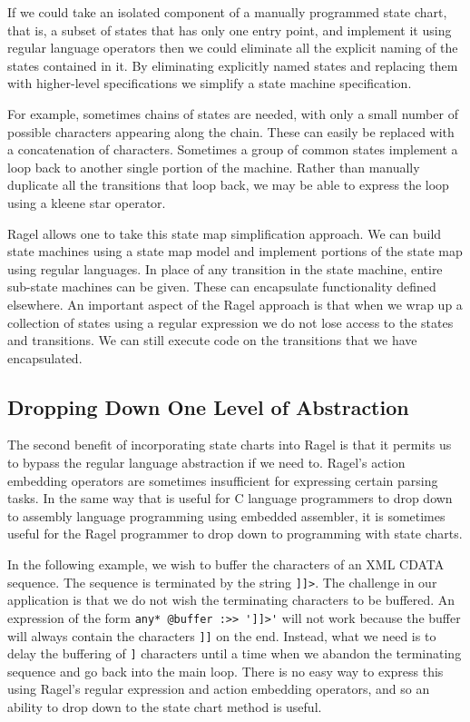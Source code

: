 \documentclass[letterpaper,11pt,oneside]{book}
\begin{document}
If we could take an isolated component of a manually programmed state chart,
that is, a subset of states that has only one entry point, and implement it
using regular language operators then we could eliminate all the explicit
naming of the states contained in it. By eliminating explicitly named states
and replacing them with higher-level specifications we simplify a state machine
specification.

For example, sometimes chains of states are needed, with only a small number of
possible characters appearing along the chain. These can easily be replaced
with a concatenation of characters. Sometimes a group of common states
implement a loop back to another single portion of the machine. Rather than
manually duplicate all the transitions that loop back, we may be able to
express the loop using a kleene star operator.

Ragel allows one to take this state map simplification approach. We can build
state machines using a state map model and implement portions of the state map
using regular languages. In place of any transition in the state machine,
entire sub-state machines can be given. These can encapsulate functionality
defined elsewhere. An important aspect of the Ragel approach is that when we
wrap up a collection of states using a regular expression we do not lose
access to the states and transitions. We can still execute code on the
transitions that we have encapsulated.

\subsection{Dropping Down One Level of Abstraction}
\label{down}

The second benefit of incorporating state charts into Ragel is that it permits
us to bypass the regular language abstraction if we need to. Ragel's action
embedding operators are sometimes insufficient for expressing certain parsing
tasks.  In the same way that is useful for C language programmers to drop down
to assembly language programming using embedded assembler, it is sometimes
useful for the Ragel programmer to drop down to programming with state charts.

In the following example, we wish to buffer the characters of an XML CDATA
sequence. The sequence is terminated by the string \verb|]]>|. The challenge
in our application is that we do not wish the terminating characters to be
buffered. An expression of the form \verb|any* @buffer :>> ']]>'| will not work
because the buffer will always contain the characters \verb|]]| on the end.
Instead, what we need is to delay the buffering of \hspace{0.25mm} \verb|]|
characters until a time when we
abandon the terminating sequence and go back into the main loop. There is no
easy way to express this using Ragel's regular expression and action embedding
operators, and so an ability to drop down to the state chart method is useful.
\end{document}
